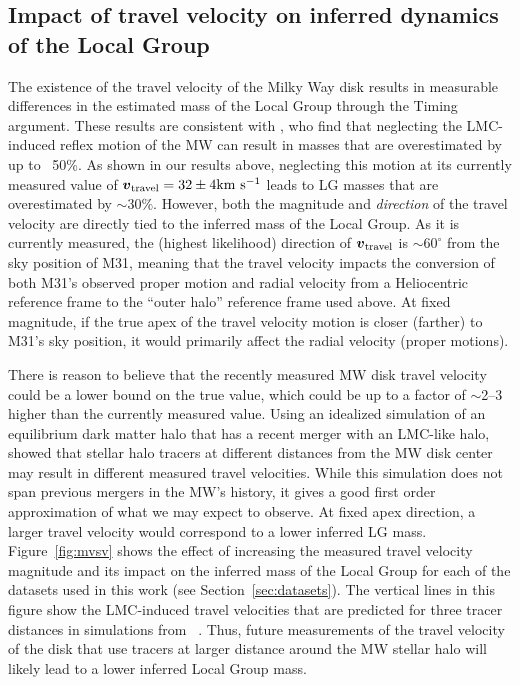 \documentclass[twocolumn]{aastex631}
\newcommand{\bov}{\ensuremath{\boldsymbol{v}}}
\newcommand{\vtrav}{\ensuremath{\bov_{\rm travel}}}
\begin{document}
\subsection{Impact of travel velocity on inferred dynamics of the Local Group}
\label{sec:discussion-impact}
The existence of the travel velocity of the Milky Way disk
results in measurable differences in the estimated mass of the Local Group
through the Timing argument.
These results are consistent with \cite{Erkal2020}, who find that neglecting the
LMC-induced reflex motion of the MW can result in masses that are overestimated
by up to ~50\%.
As shown in our results above, neglecting this motion at its currently measured
value of $\vtrav=32\pm4\kms$
\citep{Petersen2021} leads to LG masses that are overestimated by $\sim30\%$.
However, both the magnitude and \emph{direction} of the travel velocity are
directly tied to the inferred mass of the Local Group.
As it is currently measured, the (highest likelihood) direction of $\vtrav$
is $\sim$$60^\circ$ from the sky position of M31, meaning that the travel
velocity impacts the conversion of both M31's observed proper motion and radial
velocity from a Heliocentric reference frame to the ``outer halo'' reference
frame used above.
At fixed magnitude, if the true apex of the travel velocity motion is closer
(farther) to M31's sky position, it would primarily affect the radial velocity
(proper motions).

There is reason to believe that the recently measured MW disk travel velocity
could be a lower bound on the true value, which could be up to a factor of
$\sim$2--3 higher than the currently measured value.
Using an idealized simulation of an equilibrium dark matter halo that has a
recent merger with an LMC-like halo, \cite{Garavito-Camargo2021b} showed that
stellar halo tracers at different distances from the MW disk center may result
in different measured travel velocities.
While this simulation does not span previous mergers in the MW's history, it
gives a good first order approximation of what we may expect to observe.
At fixed apex direction, a larger travel velocity would correspond to a lower
inferred LG mass.
Figure~\ref{fig:mvsv} shows the effect of increasing the measured travel
velocity magnitude and its impact on the inferred mass of the Local Group for
each of the datasets used in this work (see Section~\ref{sec:datasets}).
The vertical lines in this figure show the LMC-induced travel velocities that
are predicted for three tracer distances in simulations from
~\cite{Garavito-Camargo2021b}.
Thus, future measurements of the travel velocity of the disk that use tracers at
larger distance around the MW stellar halo will likely lead to a lower inferred
Local Group mass.
\end{document}
